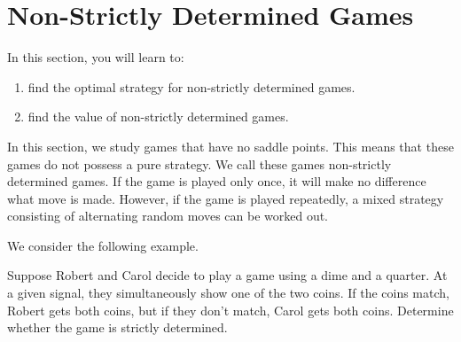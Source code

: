 
\section{Non-Strictly Determined Games}\label{section_nonstrictly_determined_games}

In this section, you will learn to:
\begin{enumerate}
    \item find the optimal strategy for non-strictly determined games.
    \item find the value of non-strictly determined games.
\end{enumerate}

In this section, we study games that have no saddle points.  This means that these games do not possess a pure strategy.  We call these games non-strictly determined games.  If the game is played only once, it will make no difference what move is made.   However, if the game is played repeatedly, a mixed strategy consisting of alternating random moves can be worked out.

We consider the following example.

\begin{example}\label{example_matching_coins}
    Suppose Robert and Carol decide to play a game using a dime and a quarter. At a given signal, they simultaneously show one of the two coins. If the coins match, Robert gets both coins, but if they don't match, Carol gets both coins. Determine whether the game is strictly determined.
\end{example}

